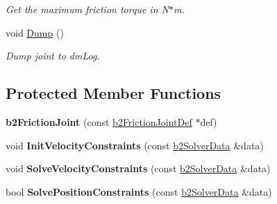 \begin{DoxyCompactItemize}
\begin{DoxyCompactList}\small\item\em Get the maximum friction torque in N$\ast$m. \end{DoxyCompactList}\item 
void \hyperlink{classb2_friction_joint_a9a27084c9f4a7ea0a4f590f687ac1edb}{Dump} ()\hypertarget{classb2_friction_joint_a9a27084c9f4a7ea0a4f590f687ac1edb}{}\label{classb2_friction_joint_a9a27084c9f4a7ea0a4f590f687ac1edb}

\begin{DoxyCompactList}\small\item\em Dump joint to dm\+Log. \end{DoxyCompactList}\end{DoxyCompactItemize}
\subsection*{Protected Member Functions}
\begin{DoxyCompactItemize}
\item 
{\bfseries b2\+Friction\+Joint} (const \hyperlink{structb2_friction_joint_def}{b2\+Friction\+Joint\+Def} $\ast$def)\hypertarget{classb2_friction_joint_a7413c5f289257f0e993b7e750fe95b99}{}\label{classb2_friction_joint_a7413c5f289257f0e993b7e750fe95b99}

\item 
void {\bfseries Init\+Velocity\+Constraints} (const \hyperlink{structb2_solver_data}{b2\+Solver\+Data} \&data)\hypertarget{classb2_friction_joint_a72fbe2a2dce2c90e1b68395e715e1254}{}\label{classb2_friction_joint_a72fbe2a2dce2c90e1b68395e715e1254}

\item 
void {\bfseries Solve\+Velocity\+Constraints} (const \hyperlink{structb2_solver_data}{b2\+Solver\+Data} \&data)\hypertarget{classb2_friction_joint_a5aab459109e198a75e0151f36d50ee65}{}\label{classb2_friction_joint_a5aab459109e198a75e0151f36d50ee65}

\item 
bool {\bfseries Solve\+Position\+Constraints} (const \hyperlink{structb2_solver_data}{b2\+Solver\+Data} \&data)\hypertarget{classb2_friction_joint_ac1998353c72787b6074b2ef50dd1c2d2}{}\label{classb2_friction_joint_ac1998353c72787b6074b2ef50dd1c2d2}

\end{DoxyCompactItemize}
